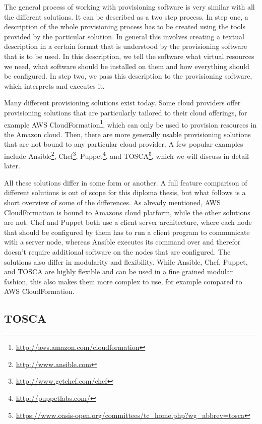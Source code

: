 The general process of working with provisioning software is very similar with all the different solutions.
It can be described as a two step process.
In step one, a description of the whole provisioning process has to be created using the tools provided by the particular solution.
In general this involves creating a textual description in a certain format that is understood by the provisioning software that is to be used.
In this description, we tell the software what virtual resources we need, what software should be installed on them and how everything should be configured.
In step two, we pass this description to the provisioning software, which interprets and executes it.

Many different provisioning solutions exist today.
Some cloud providers offer provisioning solutions that are particularly tailored to their cloud offerings, for example AWS CloudFormation\footnote{\url{http://aws.amazon.com/cloudformation}}, which can only be used to provision resources in the Amazon cloud.
Then, there are more generally usable provisioning solutions that are not bound to any particular cloud provider.
A few popular examples include Ansible\footnote{\url{http://www.ansible.com}}, Chef\footnote{\url{http://www.getchef.com/chef}}, Puppet\footnote{\url{http://puppetlabs.com/}}, and TOSCA\footnote{\url{https://www.oasis-open.org/committees/tc_home.php?wg_abbrev=tosca}}, which we will discuss in detail later.

All these solutions differ in some form or another.
A full feature comparison of different solutions is out of scope for this diploma thesis, but what follows is a short overview of some of the differences.
As already mentioned, AWS CloudFormation is bound to Amazons cloud platform, while the other solutions are not.
Chef and Puppet both use a client server architecture, where each node that should be configured by them has to run a client program to communicate with a server node, whereas Ansible executes its command over  and therefor doesn't require additional software on the nodes that are configured.
The solutions also differ in modularity and flexibility. While Ansible, Chef, Puppet, and TOSCA are highly flexible and can be used in a fine grained modular fashion, this also makes them more complex to use, for example compared to AWS CloudFormation.

\subsection{TOSCA}

